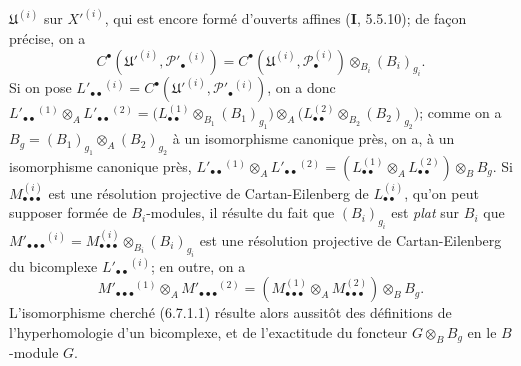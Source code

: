 \begin{env}[6.7.1]
$\mathfrak U^{(i)}$ sur $X'^{(i)}$, qui est encore formé d'ouverts affines
(\textbf{I}, 5.5.10); de façon précise, on a
\[
  C^\bullet(\mathfrak U'^{(i)},\mathscr P'_\bullet{}^{(i)})
  =C^\bullet(\mathfrak U^{(i)},\mathscr P_\bullet^{(i)})
   \otimes_{B_i}(B_i)_{g_i}.
\]
Si on pose
$L'_{\bullet\bullet}{}^{(i)}
=C^\bullet(\mathfrak U'^{(i)},\mathscr P'_\bullet{}^{(i)})$, on a donc
$
  L'_{\bullet\bullet}{}^{(1)}\otimes_A L'_{\bullet\bullet}{}^{(2)}
  =\bigl(L_{\bullet\bullet}^{(1)}\otimes_{B_1}(B_1)_{g_1}\bigr)
   \otimes_A
   \bigl(L_{\bullet\bullet}^{(2)}\otimes_{B_2}(B_2)_{g_2}\bigr)$;
comme on a $B_g=(B_1)_{g_1}\otimes_A(B_2)_{g_2}$ à un isomorphisme
canonique près, on a, à un isomorphisme canonique près,
$
  L'_{\bullet\bullet}{}^{(1)}\otimes_A L'_{\bullet\bullet}{}^{(2)}
  =(L_{\bullet\bullet}^{(1)}\otimes_A L_{\bullet\bullet}^{(2)})
    \otimes_B B_g$.
Si $M_{\bullet\bullet\bullet}^{(i)}$ est une résolution projective de
Cartan-Eilenberg de $L_{\bullet\bullet}^{(i)}$, qu'on peut supposer formée de
$B_i$-modules, il résulte du fait que $(B_i)_{g_i}$ est \emph{plat} sur $B_i$
que
$M'_{\bullet\bullet\bullet}{}^{(i)}
=M_{\bullet\bullet\bullet}^{(i)}\otimes_{B_i}(B_i)_{g_i}$ est une résolution
projective de Cartan-Eilenberg du bicomplexe
$L'_{\bullet\bullet}{}^{(i)}$; en outre, on a
\[
  M'_{\bullet\bullet\bullet}{}^{(1)}\otimes_A M'_{\bullet\bullet\bullet}{}^{(2)}
  =(M_{\bullet\bullet\bullet}^{(1)}\otimes_A M_{\bullet\bullet\bullet}^{(2)})
    \otimes_B B_g.
\]
L'isomorphisme cherché (6.7.1.1) résulte alors aussitôt des définitions de
l'hyperhomologie d'un bicomplexe, et de l'exactitude du foncteur
$G\otimes_B B_g$ en le $B$-module $G$.
\end{env}

